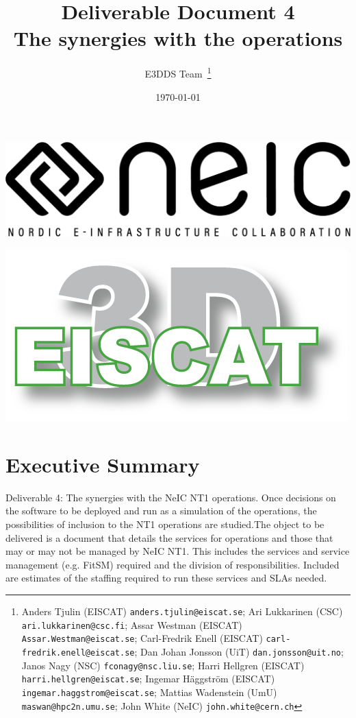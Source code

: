 \documentclass[12pt,a4paper]{article}
\title{
{\bf Deliverable Document 4} \\
The synergies with the \nnt operations}
\author{E3DDS Team~\footnote{
Anders Tjulin (EISCAT) {\tt anders.tjulin@eiscat.se};
Ari Lukkarinen (CSC) {\tt ari.lukkarinen@csc.fi};
Assar Westman (EISCAT) {\tt Assar.Westman@eiscat.se};
Carl-Fredrik Enell (EISCAT) {\tt carl-fredrik.enell@eiscat.se};
Dan Johan Jonsson (UiT) {\tt dan.jonsson@uit.no};
Janos Nagy (NSC) {\tt fconagy@nsc.liu.se};
Harri Hellgren (EISCAT) {\tt harri.hellgren@eiscat.se};
Ingemar H\"{a}ggstr\"{o}m (EISCAT) {\tt ingemar.haggstrom@eiscat.se};
Mattias Wadenstein (UmU) {\tt maswan@hpc2n.umu.se};
John White (NeIC) {\tt john.white@cern.ch}}}
\date{\today}
\newcommand{\nnt}{NeIC NT1\xspace}
\begin{document}
\pagestyle{fancy}

\maketitle
\par\noindent
\begin{minipage}{0.5\textwidth}
  \includegraphics[scale=0.18]{NEIC_logo_screen_black.pdf}
\end{minipage}
\begin{minipage}{0.5\textwidth}
  \hfill
  \includegraphics[width=0.75\linewidth]{e3d-logo-green-500px}
\end{minipage}

\newpage
\tableofcontents
\newpage

\section{Executive Summary}
\label{exec-summ}


Deliverable 4: The synergies with the \nnt operations. Once decisions on the software to be deployed and run as a simulation of the \ED operations, the possibilities of inclusion to the NT1 operations are studied.The object to be delivered is a document that details the services for \ED operations and those that may or may not be managed by \nnt. This includes the services and service management (e.g. FitSM) required and the division of responsibilities.  Included are estimates of the staffing required to run these services and SLAs needed. 
\end{document}
